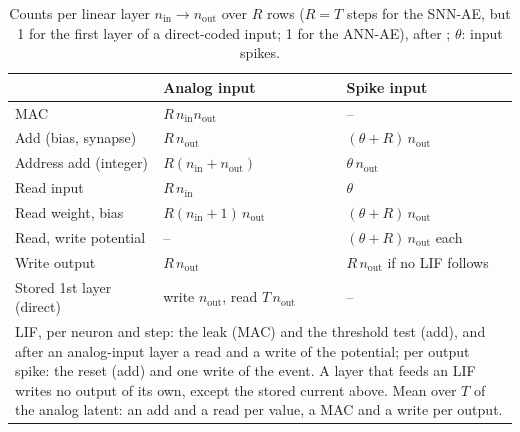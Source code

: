 \documentclass[conference]{IEEEtran}
\begin{document}
\begin{table}[!t]
\caption{Counts per linear layer $n_{\mathrm{in}}{\to}n_{\mathrm{out}}$ over $R$ rows ($R=T$
steps for the SNN-AE, but 1 for the first layer of a direct-coded input; 1 for the ANN-AE),
after \cite{lemaire2022analytical}; $\theta$: input spikes.}
\centering\footnotesize
\setlength{\tabcolsep}{1.2pt}
\begin{tabular}{lll}
\toprule
 & Analog input & Spike input \\
\midrule
MAC & $R\,n_{\mathrm{in}}n_{\mathrm{out}}$ & -- \\
Add (bias, synapse) & $R\,n_{\mathrm{out}}$ & $(\theta+R)\,n_{\mathrm{out}}$ \\
Address add (integer) & $R(n_{\mathrm{in}}+n_{\mathrm{out}})$ & $\theta\,n_{\mathrm{out}}$ \\
Read input & $R\,n_{\mathrm{in}}$ & $\theta$ \\
Read weight, bias & $R(n_{\mathrm{in}}+1)\,n_{\mathrm{out}}$ & $(\theta+R)\,n_{\mathrm{out}}$ \\
Read, write potential & -- & $(\theta+R)\,n_{\mathrm{out}}$ each \\
Write output & $R\,n_{\mathrm{out}}$ & $R\,n_{\mathrm{out}}$ if no LIF follows \\
Stored 1st layer (direct) & write $n_{\mathrm{out}}$, read $T\,n_{\mathrm{out}}$ & -- \\
\midrule
\multicolumn{3}{p{0.93\columnwidth}}{LIF, per neuron and step: the leak (MAC) and the threshold
test (add), and after an analog-input layer a read and a write of the potential; per output
spike: the reset (add) and one write of the event. A layer that feeds an LIF writes no output
of its own, except the stored current above. Mean over $T$ of the analog latent: an add and a
read per value, a MAC and a write per output.} \\
\bottomrule
\end{tabular}
\label{tab:cost}
\end{table}
\end{document}

